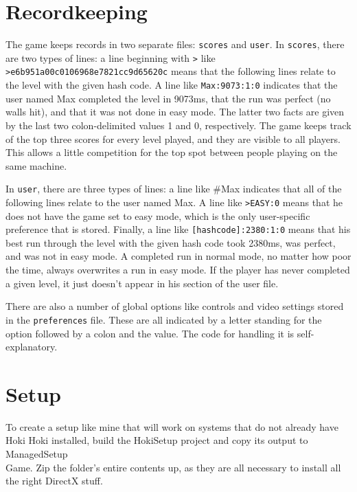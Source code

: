 \documentclass [12pt]{article}
\begin{document}
\section{Recordkeeping}

The game keeps records in two separate files: \texttt{scores} and \linebreak\texttt{user}. In \texttt{scores}, there are two types of lines: a line beginning with \texttt{>} like \texttt{>e6b951a00c0106968e7821cc9d65620c} means that the following lines relate to the level with the given hash code. A line like \texttt{Max:9073:1:0} indicates that the user named Max completed the level in 9073ms, that the run was perfect (no walls hit), and that it was not done in easy mode. The latter two facts are given by the last two colon-delimited values 1 and 0, respectively. The game keeps track of the top three scores for every level played, and they are visible to all players. This allows a little competition for the top spot between people playing on the same machine.

In \texttt{user}, there are three types of lines: a line like \#Max indicates that all of the following lines relate to the user named Max. A line like \texttt{>EASY:0} means that he does not have the game set to easy mode, which is the only user-specific preference that is stored. Finally, a line like \texttt{[hashcode]:2380:1:0} means that his best run through the level with the given hash code took 2380ms, was perfect, and was not in easy mode. A completed run in normal mode, no matter how poor the time, always overwrites a run in easy mode. If the player has never completed a given level, it just doesn't appear in his section of the user file.

There are also a number of global options like controls and video settings stored in the \texttt{preferences} file. These are all indicated by a letter standing for the option followed by a colon and the value. The code for handling it is self-explanatory.

\section{Setup}

To create a setup like mine that will work on systems that do not already have Hoki Hoki installed, build the HokiSetup project and copy its output to ManagedSetup\\Game. Zip the folder's entire contents up, as they are all necessary to install all the right DirectX stuff.
\end{document}
